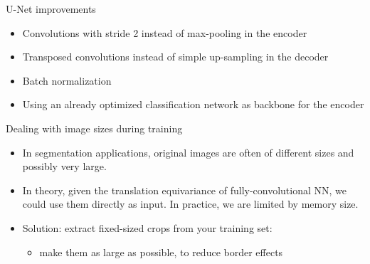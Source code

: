 \documentclass[xcolor=pdftex,dvipsnames,table,mathserif]{beamer}
\begin{document}





\begin{frame}{U-Net improvements}

  \begin{itemize}
  \item Convolutions with stride 2 instead of max-pooling in the encoder
  \item Transposed convolutions instead  of simple up-sampling in the decoder
  \item Batch normalization
  \item Using an already optimized classification network as backbone for the encoder
  \end{itemize}

\end{frame}




\begin{frame}{Dealing with image sizes during training}

  \begin{itemize}[<+->]
  \item   In segmentation applications, original images are often of different sizes and possibly very large.
  \item   In theory, given the translation equivariance of fully-convolutional NN, we could use them directly as input. In practice, we are limited by memory size.
  \item   Solution: extract fixed-sized crops from your training set:
    \begin{itemize}
    \item make them as large as possible, to reduce border effects
    \end{itemize}

  \end{itemize}

\end{frame}
\end{document}
